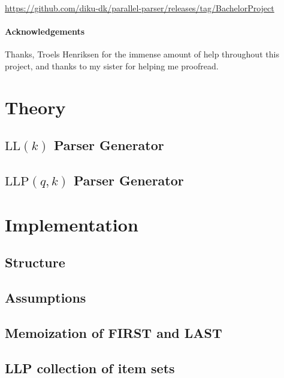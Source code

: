 \documentclass[a4paper,12pt]{article}
\newcommand\LL{\text{LL}}
\newcommand\LLP{\text{LLP}}
\theoremstyle{definition}
\begin{document}
\noindent \href{https://github.com/diku-dk/parallel-parser/releases/tag/BachelorProject}{https://github.com/diku-dk/parallel-parser/releases/tag/BachelorProject}

\paragraph{Acknowledgements}
Thanks, Troels Henriksen for the immense amount of help throughout this project, and thanks to my sister for helping me proofread.

\section{Theory}

\subsection{\texorpdfstring{$\LL(k)$}{TEXT} Parser Generator}


\subsection{\texorpdfstring{$\LLP(q,k)$}{TEXT} Parser Generator}


\section{Implementation}

\subsection{Structure}


\subsection{Assumptions}\label{sec:assumptions}


\subsection{Memoization of FIRST and LAST}


\subsection{LLP collection of item sets}

\end{document}

